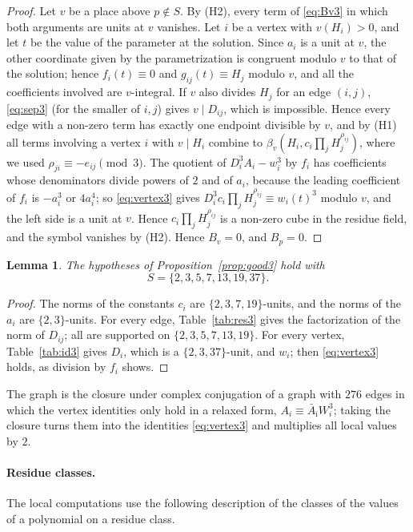 \documentclass[11pt]{article}
\newtheorem{lemma}[theorem]{Lemma}
\begin{document}
\begin{proof}
Let $v$ be a place above $p\notin S$. By (H2), every term of \eqref{eq:Bv3} in which both arguments are units at $v$ vanishes. Let $i$ be a vertex with $v(H_i)>0$, and let $t$ be the value of the parameter at the solution. Since $a_i$ is a unit at $v$, the other coordinate given by the parametrization is congruent modulo $v$ to that of the solution; hence $f_i(t)\equiv0$ and $g_{ij}(t)\equiv H_j$ modulo $v$, and all the coefficients involved are $v$-integral. If $v$ also divides $H_j$ for an edge $(i,j)$, \eqref{eq:sep3} (for the smaller of $i,j$) gives $v\mid D_{ij}$, which is impossible. Hence every edge with a non-zero term has exactly one endpoint divisible by $v$, and by (H1) all terms involving a vertex $i$ with $v\mid H_i$ combine to $\beta_v(H_i,c_i\prod_jH_j^{\rho_{ij}})$, where we used $\rho_{ji}\equiv-e_{ij}\pmod3$. The quotient of $D_i^3A_i-w_i^3$ by $f_i$ has coefficients whose denominators divide powers of $2$ and of $a_i$, because the leading coefficient of $f_i$ is $-a_i^3$ or $4a_i^4$; so \eqref{eq:vertex3} gives $D_i^3c_i\prod_jH_j^{\rho_{ij}}\equiv w_i(t)^3$ modulo $v$, and the left side is a unit at $v$. Hence $c_i\prod_jH_j^{\rho_{ij}}$ is a non-zero cube in the residue field, and the symbol vanishes by (H2). Hence $B_v=0$, and $B_p=0$.
\end{proof}

\begin{lemma}\label{lem:checks3}
The hypotheses of Proposition~\ref{prop:good3} hold with
\[
S=\{2,3,5,7,13,19,37\}.
\]
\end{lemma}

\begin{proof}
The norms of the constants $c_i$ are $\{2,3,7,19\}$-units, and the norms of the $a_i$ are $\{2,3\}$-units. For every edge, Table~\ref{tab:res3} gives the factorization of the norm of $D_{ij}$; all are supported on $\{2,3,5,7,13,19\}$. For every vertex, Table~\ref{tab:id3} gives $D_i$, which is a $\{2,3,37\}$-unit, and $w_i$; then \eqref{eq:vertex3} holds, as division by $f_i$ shows.
\end{proof}

The graph is the closure under complex conjugation of a graph with $276$ edges in which the vertex identities only hold in a relaxed form, $A_i\equiv\bar A_{\bar\imath}W_i^3$; taking the closure turns them into the identities \eqref{eq:vertex3} and multiplies all local values by $2$.

\paragraph{Residue classes.} The local computations use the following description of the classes of the values of a polynomial on a residue class.
\end{document}

